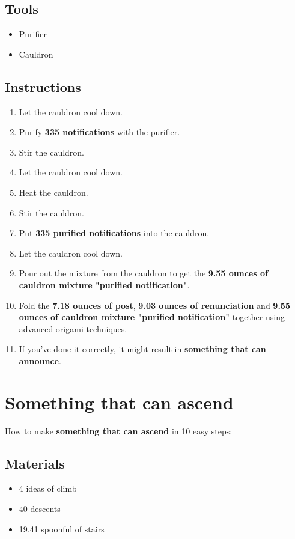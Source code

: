 \documentclass{article}
\begin{document}
\subsection{Tools}\begin{itemize}
\item 
Purifier
\item 
Cauldron
\end{itemize}
\subsection{Instructions}\begin{enumerate}
\item 
Let the cauldron cool down.
\item 
Purify \textbf{335 notifications} with the purifier.
\item 
Stir the cauldron.
\item 
Let the cauldron cool down.
\item 
Heat the cauldron.
\item 
Stir the cauldron.
\item 
Put \textbf{335 purified notifications} into the cauldron.
\item 
Let the cauldron cool down.
\item 
Pour out the mixture from the cauldron to get the \textbf{9.55 ounces of cauldron mixture "purified notification"}.
\item 
Fold the \textbf{7.18 ounces of post}, \textbf{9.03 ounces of renunciation} and \textbf{9.55 ounces of cauldron mixture "purified notification"} together using advanced origami techniques.
\item 
If you've done it correctly, it might result in \textbf{something that can announce}.
\end{enumerate}
\newpage
\section{Something that can ascend}How to make \textbf{something that can ascend} in 10 easy steps:

\subsection{Materials}\begin{itemize}
\item 
4 ideas of climb
\item 
40 descents
\item 
19.41 spoonful of stairs
\end{itemize}
\end{document}
